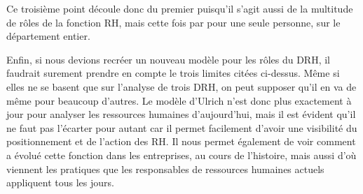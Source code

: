 Ce troisième point découle donc du premier puisqu'il s'agit aussi de la multitude de rôles de la fonction RH, mais cette fois par pour une seule personne, sur le département entier. \newline

Enfin, si nous devions recréer un nouveau modèle pour les rôles du DRH, il faudrait surement prendre en compte le trois limites citées ci-dessus. Même si elles ne se basent que sur l'analyse de trois DRH, on peut supposer qu'il en va de même pour beaucoup d'autres. Le modèle d'Ulrich n'est donc plus exactement à jour pour analyser les ressources humaines d'aujourd'hui, mais il est évident qu'il ne faut pas l'écarter pour autant car il permet facilement d'avoir une visibilité du positionnement et de l'action des RH. Il nous permet également de voir comment a évolué cette fonction dans les entreprises, au cours de l'histoire, mais aussi d'où viennent les pratiques que les responsables de ressources humaines actuels appliquent tous les jours. \\
